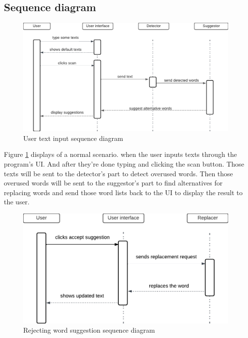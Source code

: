 \documentclass[12pt,oneside,openright,a4paper]{cpe-english-project}
\begin{document}
\subsection{Sequence diagram}
\begin{figure}[!h]\centering
\includegraphics[width=15cm]{./img/chp3/Sequence1.png}
\caption{User text input sequence diagram}\label{fig:seq1}
\end{figure}

Figure \ref{fig:seq1} displays of a normal scenario. when the user inputs texts through the program’s UI. And after they’re done typing and clicking the scan button. Those texts will be sent to the detector's part to detect overused words. Then those overused words will be sent to the suggestor’s part to find alternatives for replacing words and send those word lists back to the UI to display the result to the user.

\begin{figure}[!h]\centering
\includegraphics[width=15cm]{./img/chp3/Sequence2.png}
\caption{Rejecting word suggestion sequence diagram}\label{fig:seq2}
\end{figure}
\end{document}
